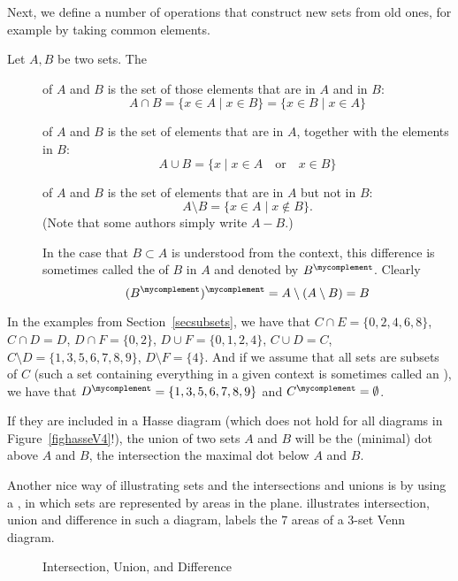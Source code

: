 Next, we define a number of operations that construct new sets from old
ones, for example by taking common elements.
\begin{defn}
Let $A,B$ be two sets. The
\begin{description}
\item[] of $A$ and $B$ is the set of those elements
that are in $A$ and in $B$:
\[
A\cap B=\{x\in A\mid x\in B\}=\{x\in B\mid x\in A\}
\]
\item[] of $A$ and $B$ is the set of elements
that are in $A$, together with the elements in $B$:
\[
A\cup B=\{x\mid x\in A\quad\mbox{or}\quad x\in B\}
\]
\item[] of $A$ and $B$ is the set of elements that are in
$A$ but not in $B$:
\[
A\setminus B=\{x\in A\mid x\not\in B\}.
\]
(Note that some authors simply write $A-B$.)

In the case that $B\subset A$ is understood from the context, this difference is sometimes called
the  of $B$ in $A$ and denoted by $B^\mycomplement$.
Clearly
\[
(B^\mycomplement)^\mycomplement=A\setminus(A\setminus B)=B
\]
\end{description}
\end{defn}
In the examples from Section~\ref{secsubsets}, we have that
$C\cap E=\{0,2,4,6,8\}$, $C\cap D=D$, $D\cap
F=\{0,2\}$, $D\cup F=\{0,1,2,4\}$, $C\cup D=C$, $C\setminus
D=\{1,3,5,6,7,8,9\}$, $D\setminus F=\{4\}$.
And if we assume that all sets are subsets of $C$ (such a set containing
everything in a given context is sometimes called an ), we
have that $D^\mycomplement=\{1,3,5,6,7,8,9\}$ and $C^\mycomplement=\emptyset$.

If they are included in a Hasse diagram (which does not hold for all
diagrams in Figure~\ref{fighasseV4}!), the union of two sets $A$ and $B$
will be the (minimal) dot above $A$ and $B$, the intersection the maximal
dot below $A$ and $B$.
\medskip

Another nice way of illustrating sets and the intersections and unions
is by using a , in which sets are represented by areas in the plane.
 illustrates intersection, union and difference in
such a diagram,  labels the 7 areas of a 3-set Venn
diagram.

\begin{figure}[t]
\begin{center}
\end{center}
\caption{Intersection, Union, and Difference}
\label{figvennmulti}
\end{figure}

